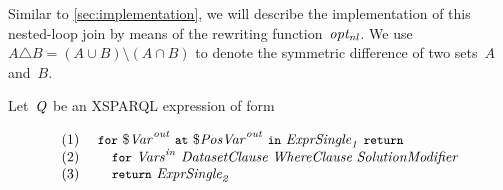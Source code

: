 Similar to \cref{sec:implementation}, we will describe the implementation of this nested-loop join by means of
the rewriting function~$\mathit{opt_{nl}}$. We use~$A \triangle B = \left(A \cup B\right)
\setminus \left(A \cap B\right)$ to denote the symmetric difference of two sets~$A$ and~$B$.


Let~$\mathit{{Q}_{}}$ be an XSPARQL expression of form

\begin{queryF}
  \[
  \begin{array}{l}
  \mathrm{(1)~~~~}\texttt{{\small for}}~{\mathit{\$\mathit{Var}}}_{\mathit{}}^{\mathit{out}}~\texttt{{\small at}}~{\mathit{\$\mathit{PosVar}}}_{\mathit{}}^{\mathit{out}}~\texttt{{\small in}}~\mathit{{{\textit{Expr\-Single}}}_{1}}~\texttt{{\small return}}\\
  \mathrm{(2)~~~~}\quad\texttt{{\small for}}~{\mathit{\mathit{Vars}}}_{\mathit{}}^{\mathit{in}}~{\textit{Da\-ta\-set\-Clau\-se}}~{\textit{Whe\-re\-Clause}}~{\textit{Solution\-Modifier}}\\
  \mathrm{(3)~~~~}\quad\texttt{{\small return}}~\mathit{{{\textit{Expr\-Single}}}_{2}}
\end{array}
\]
\label{eq:expr_sdep_xquery}
\end{queryF}%

